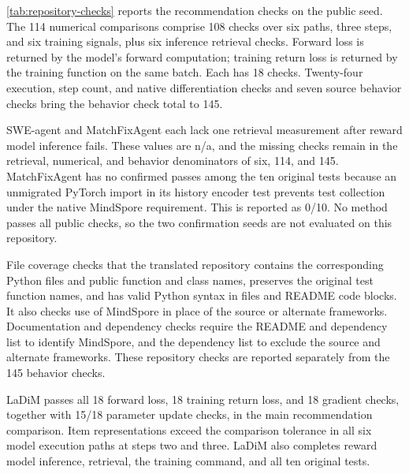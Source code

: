 \cref{tab:repository-checks} reports the recommendation checks on the public seed. The 114 numerical comparisons comprise 108 checks over six paths, three steps, and six training signals, plus six inference retrieval checks. Forward loss is returned by the model's forward computation; training return loss is returned by the training function on the same batch. Each has 18 checks. Twenty-four execution, step count, and native differentiation checks and seven source behavior checks bring the behavior check total to 145.

SWE-agent and MatchFixAgent each lack one retrieval measurement after reward model inference fails. These values are n/a, and the missing checks remain in the retrieval, numerical, and behavior denominators of six, 114, and 145. MatchFixAgent has no confirmed passes among the ten original tests because an unmigrated PyTorch import in its history encoder test prevents test collection under the native MindSpore requirement. This is reported as 0/10. No method passes all public checks, so the two confirmation seeds are not evaluated on this repository.

File coverage checks that the translated repository contains the corresponding Python files and public function and class names, preserves the original test function names, and has valid Python syntax in files and README code blocks. It also checks use of MindSpore in place of the source or alternate frameworks. Documentation and dependency checks require the README and dependency list to identify MindSpore, and the dependency list to exclude the source and alternate frameworks. These repository checks are reported separately from the 145 behavior checks.

LaDiM passes all 18 forward loss, 18 training return loss, and 18 gradient checks, together with 15/18 parameter update checks, in the main recommendation comparison. Item representations exceed the comparison tolerance in all six model execution paths at steps two and three. LaDiM also completes reward model inference, retrieval, the training command, and all ten original tests.
\begin{table}[!t]
\caption{Recommendation repository checks passed on the public seed. The 114 numerical checks are included in the 145 behavior checks. The six training signal rows divide the 108 training checks, with 18 per signal. One unmeasured retrieval check remains in the denominators for SWE-agent and MatchFixAgent.}
\label{tab:repository-checks}
\centering
\small
\setlength{\tabcolsep}{4pt}

\end{table}

